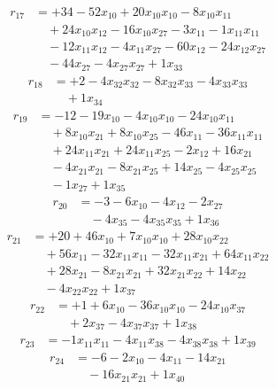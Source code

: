\[\begin{aligned}
r_{17} &= + 34 - 52 x_{10} + 20 x_{10} x_{10} - 8 x_{10} x_{11} \\
 &\quad + 24 x_{10} x_{12} - 16 x_{10} x_{27} - 3 x_{11} - 1 x_{11} x_{11} \\
 &\quad - 12 x_{11} x_{12} - 4 x_{11} x_{27} - 60 x_{12} - 24 x_{12} x_{27} \\
 &\quad - 44 x_{27} - 4 x_{27} x_{27} + 1 x_{33}
\end{aligned}\]
\[\begin{aligned}
r_{18} &= + 2 - 4 x_{32} x_{32} - 8 x_{32} x_{33} - 4 x_{33} x_{33} \\
 &\quad + 1 x_{34}
\end{aligned}\]
\[\begin{aligned}
r_{19} &= - 12 - 19 x_{10} - 4 x_{10} x_{10} - 24 x_{10} x_{11} \\
 &\quad + 8 x_{10} x_{21} + 8 x_{10} x_{25} - 46 x_{11} - 36 x_{11} x_{11} \\
 &\quad + 24 x_{11} x_{21} + 24 x_{11} x_{25} - 2 x_{12} + 16 x_{21} \\
 &\quad - 4 x_{21} x_{21} - 8 x_{21} x_{25} + 14 x_{25} - 4 x_{25} x_{25} \\
 &\quad - 1 x_{27} + 1 x_{35}
\end{aligned}\]
\[\begin{aligned}
r_{20} &= - 3 - 6 x_{10} - 4 x_{12} - 2 x_{27} \\
 &\quad - 4 x_{35} - 4 x_{35} x_{35} + 1 x_{36}
\end{aligned}\]
\[\begin{aligned}
r_{21} &= + 20 + 46 x_{10} + 7 x_{10} x_{10} + 28 x_{10} x_{22} \\
 &\quad + 56 x_{11} - 32 x_{11} x_{11} - 32 x_{11} x_{21} + 64 x_{11} x_{22} \\
 &\quad + 28 x_{21} - 8 x_{21} x_{21} + 32 x_{21} x_{22} + 14 x_{22} \\
 &\quad - 4 x_{22} x_{22} + 1 x_{37}
\end{aligned}\]
\[\begin{aligned}
r_{22} &= + 1 + 6 x_{10} - 36 x_{10} x_{10} - 24 x_{10} x_{37} \\
 &\quad + 2 x_{37} - 4 x_{37} x_{37} + 1 x_{38}
\end{aligned}\]
\[\begin{aligned}
r_{23} &= - 1 x_{11} x_{11} - 4 x_{11} x_{38} - 4 x_{38} x_{38} + 1 x_{39}
\end{aligned}\]
\[\begin{aligned}
r_{24} &= - 6 - 2 x_{10} - 4 x_{11} - 14 x_{21} \\
 &\quad - 16 x_{21} x_{21} + 1 x_{40}
\end{aligned}\]
